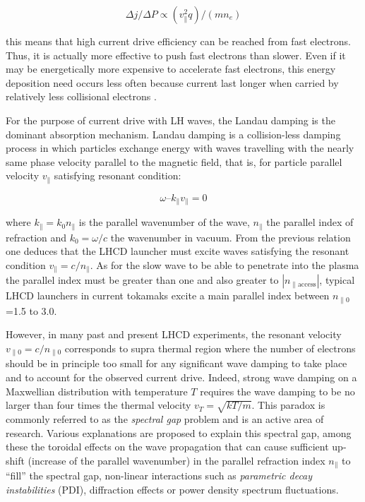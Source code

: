 $$\Delta j/ \Delta P \propto (v_{\parallel}^2 q) / (m n_e)$$

this means that high current drive efficiency can be reached from fast electrons. Thus, it is actually more effective to push fast electrons than slower. Even if it may be energetically more expensive to accelerate fast electrons, this energy deposition need occurs less often because current last longer when carried by relatively less collisional electrons \parencite{Fisch1987}. 

For the purpose of current drive with LH waves, the Landau damping is the dominant absorption mechanism. Landau damping is a collision-less damping process in which particles exchange energy with waves travelling with the nearly same phase velocity parallel to the magnetic field, that is, for particle parallel velocity $v_{\parallel}$ satisfying resonant condition:

$$\omega – k_{\parallel} v_{\parallel} = 0 $$ 

where $k_{\parallel}=k_0 n_{\parallel}$ is the parallel wavenumber of the wave, $n_{\parallel}$ the parallel index of refraction and $k_0= \omega/c$ the wavenumber in vacuum. From the previous relation one deduces that the LHCD launcher must excite waves satisfying the resonant condition $v_{\parallel}=c/n_{\parallel}$. As for the slow wave to be able to penetrate into the plasma the parallel index must be greater than one and also greater to $|n_{\parallel \mathrm{access}}|$, typical LHCD launchers in current tokamaks excite a main parallel index between $n_{\parallel 0}$=1.5 to 3.0. 

However, in many past and present LHCD experiments, the resonant velocity $v_{\parallel 0}=c/n_{\parallel 0}$ corresponds to supra thermal region where the number of electrons should be in principle too small for any significant wave damping to take place and to account for the observed current drive. Indeed, strong wave damping on a Maxwellian distribution with temperature $T$ requires the wave damping to be no larger than four times the thermal velocity $v_T=\sqrt{k T/m}$. This paradox is commonly referred to as the \emph{spectral gap} problem and is an active area of research. Various explanations are proposed to explain this spectral gap, among these the toroidal effects on the wave propagation that can cause sufficient up-shift (increase of the parallel wavenumber) in the parallel refraction index $n_{\parallel}$ to “fill” the spectral gap, non-linear interactions such as \textit{parametric decay instabilities} (PDI), diffraction effects or power density spectrum fluctuations. 


